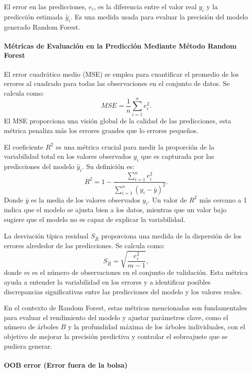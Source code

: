 El error en las predicciones, \(e_i\), es la diferencia entre el valor real \(y_i\) y la predicción estimada \(\hat{y}_i\). Es una medida usada para evaluar la precisión del modelo generado Random Forest. 

\paragraph{Métricas de Evaluación en la Predicción Mediante Método Random Forest}

El error cuadrático medio (MSE) se emplea para cuantificar el promedio de los errores al cuadrado para todas las observaciones en el conjunto de datos. Se calcula como:
\[ MSE = \frac{1}{n} \sum_{i=1}^{n} e_i^2.\]
El MSE proporciona una visión global de la calidad de las predicciones, esta métrica penaliza más los errores grandes que lo errores pequeños.

El coeficiente \(R^2\) es una métrica crucial para medir la proporción de la variabilidad total en los valores observados \(y_i\) que es capturada por las predicciones del modelo \(\hat{y}_i\). Su definición es:
\[ R^2 = 1 - \frac{\sum_{i=1}^{n} e_i^2}{\sum_{i=1}^{n} (y_i - \bar{y})^2}.\]
Donde \(\bar{y}\) es la media de los valores observados \(y_i\). Un valor de \(R^2\) más cercano a 1 indica que el modelo se ajusta bien a los datos, mientras que un valor bajo sugiere que el modelo no es capaz de explicar la variabilidad.

La desviación típica residual \(S_{\hat{R}}\) proporciona una medida de la dispersión de los errores alrededor de las predicciones. Se calcula como:
\[ S_{\hat{R}} = \sqrt{\frac{e_i^2}{m-1}},\]
donde \(m\) es el número de observaciones en el conjunto de validación. Esta métrica ayuda a entender la variabilidad en los errores y a identificar posibles discrepancias significativas entre las predicciones del modelo y los valores reales.

En el contexto de Random Forest, estas métricas mencionadas son fundamentales para evaluar el rendimiento del modelo y ajustar parámetros clave, como el número de árboles \(B\) y la profundidad máxima de los árboles individuales, con el objetivo de mejorar la precisión predictiva y controlar el sobreajuste que se pudiera generar.



\paragraph{OOB error (Error fuera de la bolsa)}\label{sec:oob}

